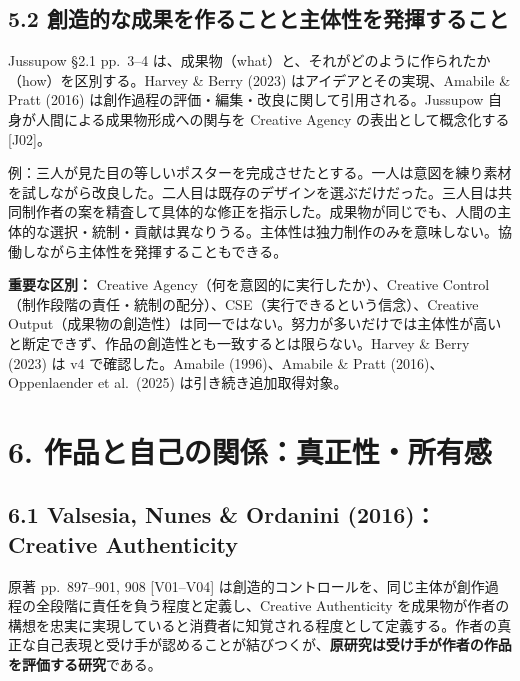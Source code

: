\documentclass[
  11pt,
  a4paper,
]{article}
\begin{document}
\subsection{5.2
創造的な成果を作ることと主体性を発揮すること}\label{ux5275ux9020ux7684ux306aux6210ux679cux3092ux4f5cux308bux3053ux3068ux3068ux4e3bux4f53ux6027ux3092ux767aux63eeux3059ux308bux3053ux3068}

Jussupow §2.1 pp.~3--4
は、成果物（what）と、それがどのように作られたか（how）を区別する。Harvey
\& Berry (2023) はアイデアとその実現、Amabile \& Pratt (2016)
は創作過程の評価・編集・改良に関して引用される。Jussupow
自身が人間による成果物形成への関与を Creative Agency
の表出として概念化する {[}J02{]}。

例：三人が見た目の等しいポスターを完成させたとする。一人は意図を練り素材を試しながら改良した。二人目は既存のデザインを選ぶだけだった。三人目は共同制作者の案を精査して具体的な修正を指示した。成果物が同じでも、人間の主体的な選択・統制・貢献は異なりうる。主体性は独力制作のみを意味しない。協働しながら主体性を発揮することもできる。

\textbf{重要な区別：} Creative
Agency（何を意図的に実行したか）、Creative
Control（制作段階の責任・統制の配分）、CSE（実行できるという信念）、Creative
Output（成果物の創造性）は同一ではない。努力が多いだけでは主体性が高いと断定できず、作品の創造性とも一致するとは限らない。Harvey
\& Berry (2023) は v4 で確認した。Amabile (1996)、Amabile \& Pratt
(2016)、Oppenlaender et al.~(2025) は引き続き追加取得対象。

\section{6.
作品と自己の関係：真正性・所有感}\label{ux4f5cux54c1ux3068ux81eaux5df1ux306eux95a2ux4fc2ux771fux6b63ux6027ux6240ux6709ux611f}

\subsection{6.1 Valsesia, Nunes \& Ordanini (2016)：Creative
Authenticity}\label{valsesia-nunes-ordanini-2016creative-authenticity}

原著 pp.~897--901, 908 {[}V01--V04{]}
は創造的コントロールを、同じ主体が創作過程の全段階に責任を負う程度と定義し、Creative
Authenticity
を成果物が作者の構想を忠実に実現していると消費者に知覚される程度として定義する。作者の真正な自己表現と受け手が認めることが結びつくが、\textbf{原研究は受け手が作者の作品を評価する研究}である。
\end{document}
